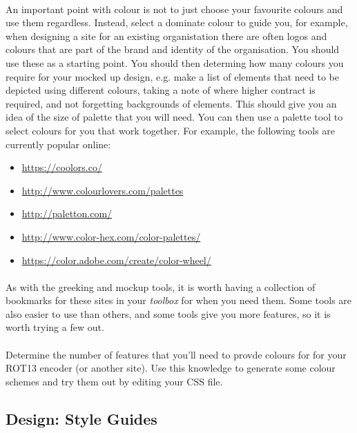 \documentclass[10pt, a4paper]{article}
\begin{document}
\paragraph{} An important point with colour is not to just choose your favourite colours and use them regardless. Instead, select a dominate colour to guide you, for example, when designing a site for an existing organistation there are often logos and colours that are part of the brand and identity of the organisation. You should use these as a starting point. You should then determing how many colours you require for your mocked up design, e.g. make a list of elements that need to be depicted using different colours, taking a note of where higher contract is required, and not forgetting backgrounds of elements. This should give you an idea of the size of palette that you will need. You can then use a palette tool to select colours for you that work together. For example, the following tools are currently popular online:

\begin{itemize}
\item \url{https://coolors.co/}
\item \url{http://www.colourlovers.com/palettes}
\item \url{http://paletton.com/}
\item \url{http://www.color-hex.com/color-palettes/}
\item \url{https://color.adobe.com/create/color-wheel/}
\end{itemize}

\paragraph{} As with the greeking and mockup tools, it is worth having a collection of bookmarks for these sites in your \emph{toolbox} for when you need them. Some tools are also easier to use than others, and some tools give you more features, so it is worth trying a few out.

\paragraph{} Determine the number of features that you'll need to provde colours for for your ROT13 encoder (or another site). Use this knowledge to generate some colour schemes and try them out by editing your CSS file.


\subsection{Design: Style Guides}
\end{document}
